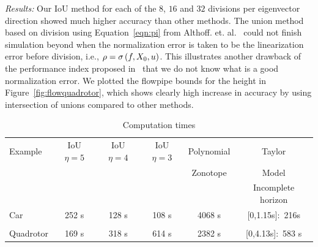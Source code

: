 \emph{Results:}  Our IoU method for each of the $8$, $16$ and $32$ divisions per
  eigenvector direction showed much higher accuracy than other
  methods.  The union method based on division using
  Equation~\ref{eqn:pi} from
  Althoff. et. al.~\cite{althoff2013reachability} could not finish
  simulation beyond when the normalization error is taken to be the
  linearization error before division, i.e., $\rho
  = \sigma\left(f,X_0,u\right)$.  This illustrates another drawback of the
  performance index proposed in~\cite{althoff2013reachability} that we
  do not know what is a good normalization error.  We plotted the
  flowpipe bounds for the height in Figure~\ref{fig:flowquadrotor},
  which shows clearly high increase in accuracy by using intersection
  of unions compared to other methods.
%
\begin{table}
\caption{Computation times}
\begin{tabular}{|l|c|c|c|c|c|}
\hline
Example & IoU $\eta = 5$ & IoU $\eta = 4$ & IoU $\eta = 3$ &
Polynomial & Taylor\\
& & & & Zonotope & Model \\
\hline
& & & & & {\color{red}Incomplete horizon}\\
Car & 252 s & 128 s & 108 s & 4068 s& {\color{red}[0,1.15s]:~216s}\\
\hline
& & & & &\\
Quadrotor & 169 s & 318 s & 614 s & 2382 s &
{\color{red}[0,4.13s]:~583 s} \\
\hline
\end{tabular}
\end{table}
%
